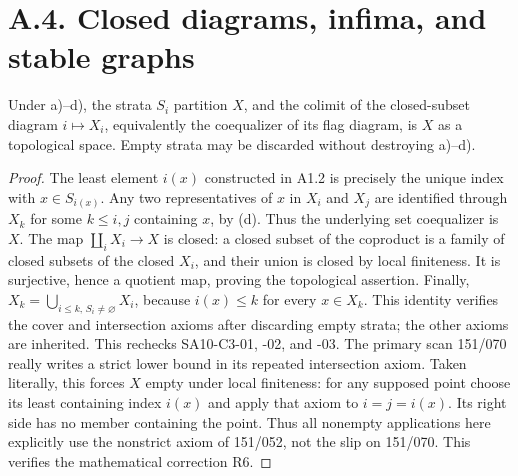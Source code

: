 \section{A.4. Closed diagrams, infima, and stable graphs}
\begin{result}\label{A4.1}
Under a)--d), the strata $S_i$ partition $X$, and the colimit of the
closed-subset diagram $i\mapsto X_i$, equivalently the coequalizer of
its flag diagram, is $X$ as a topological space. Empty strata may be
discarded without destroying a)--d).
\end{result}
\begin{proof}
The least element $i(x)$ constructed in A1.2 is precisely the unique
index with $x\in S_{i(x)}$. Any two representatives of $x$ in $X_i$ and
$X_j$ are identified through $X_k$ for some $k\leq i,j$ containing $x$,
by (d). Thus the underlying set coequalizer is $X$. The map
$\coprod_i X_i\to X$ is closed: a closed subset of the coproduct is a
family of closed subsets of the closed $X_i$, and their union is closed
by local finiteness. It is surjective, hence a quotient map, proving the
topological assertion. Finally,
$X_k=\bigcup_{i\leq k,\,S_i\ne\varnothing}X_i$, because $i(x)\leq k$
for every $x\in X_k$. This identity verifies the cover and intersection
axioms after discarding empty strata; the other axioms are inherited.
This rechecks SA10-C3-01, -02, and -03.
The primary scan 151/070 really writes a strict lower bound in its
repeated intersection axiom. Taken literally, this forces $X$ empty
under local finiteness: for any supposed point choose its least
containing index $i(x)$ and apply that axiom to $i=j=i(x)$. Its right
side has no member containing the point. Thus all nonempty applications
here explicitly use the nonstrict axiom of 151/052, not the slip on
151/070. This verifies the mathematical correction R6.
\end{proof}

